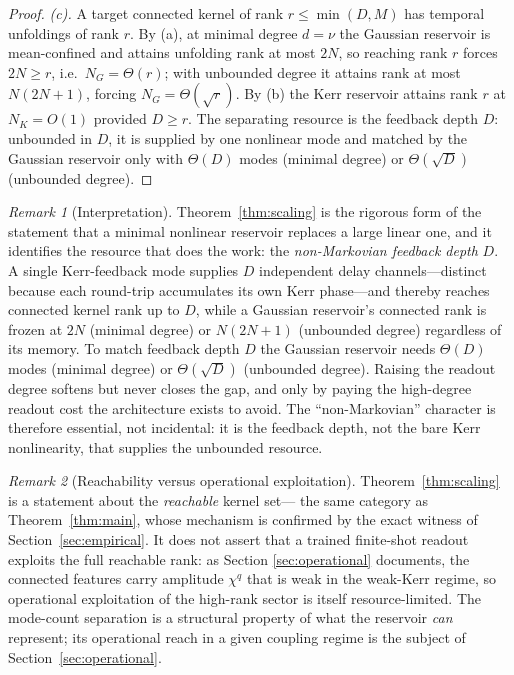 \documentclass[11pt]{article}
\theoremstyle{remark}
\newtheorem{remark}{Remark}
\begin{document}
\begin{proof}
\emph{(c).} A target connected kernel of rank $r\le\min(D,M)$ has temporal
unfoldings of rank $r$. By (a), at minimal degree $d=\nu$ the Gaussian reservoir
is mean-confined and attains unfolding rank at most $2N$, so reaching rank $r$
forces $2N\ge r$, i.e.\ $N_G=\Theta(r)$; with unbounded degree it attains rank at
most $N(2N{+}1)$, forcing $N_G=\Theta(\sqrt r)$. By (b) the Kerr reservoir attains
rank $r$ at $N_K=O(1)$ provided $D\ge r$. The separating resource is the feedback
depth $D$: unbounded in $D$, it is supplied by one nonlinear mode and matched by
the Gaussian reservoir only with $\Theta(D)$ modes (minimal degree) or
$\Theta(\sqrt D)$ (unbounded degree).
\end{proof}

\begin{remark}[Interpretation]
Theorem~\ref{thm:scaling} is the rigorous form of the statement that a minimal
nonlinear reservoir replaces a large linear one, and it identifies the resource
that does the work: the \emph{non-Markovian feedback depth} $D$. A single
Kerr-feedback mode supplies $D$ independent delay channels---distinct because each
round-trip accumulates its own Kerr phase---and thereby reaches connected kernel
rank up to $D$, while a Gaussian reservoir's connected rank is frozen at $2N$
(minimal degree) or $N(2N{+}1)$ (unbounded degree) regardless of its memory. To
match feedback depth $D$ the Gaussian reservoir needs $\Theta(D)$ modes (minimal
degree) or $\Theta(\sqrt D)$ (unbounded degree). Raising the readout degree softens
but never closes the gap, and only by paying the high-degree readout cost the
architecture exists to avoid. The ``non-Markovian'' character is therefore
essential, not incidental: it is the feedback depth, not the bare Kerr
nonlinearity, that supplies the unbounded resource.
\end{remark}

\begin{remark}[Reachability versus operational exploitation]
Theorem~\ref{thm:scaling} is a statement about the \emph{reachable} kernel set---
the same category as Theorem~\ref{thm:main}, whose mechanism is confirmed by the
exact witness of Section~\ref{sec:empirical}. It does not assert that a trained
finite-shot readout exploits the full reachable rank: as Section
\ref{sec:operational} documents, the connected features carry amplitude
$\chi^{q}$ that is weak in the weak-Kerr regime, so operational exploitation of
the high-rank sector is itself resource-limited. The mode-count separation is a
structural property of what the reservoir \emph{can} represent; its operational
reach in a given coupling regime is the subject of Section~\ref{sec:operational}.
\end{remark}
\end{document}
